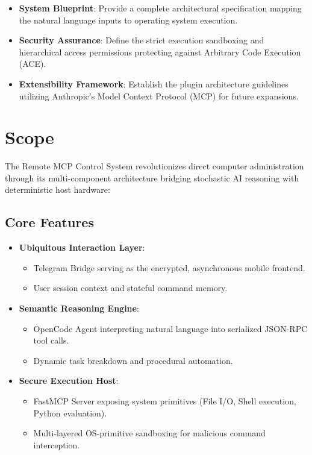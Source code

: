\documentclass{scrreprt}
\begin{document}
\begin{itemize}
    \item \textbf{System Blueprint}: Provide a complete architectural specification mapping the natural language inputs to operating system execution.
    \item \textbf{Security Assurance}: Define the strict execution sandboxing and hierarchical access permissions protecting against Arbitrary Code Execution (ACE).
    \item \textbf{Extensibility Framework}: Establish the plugin architecture guidelines utilizing Anthropic's Model Context Protocol (MCP) for future expansions.
\end{itemize}

\section{Scope}
\label{sec:scope}
The Remote MCP Control System revolutionizes direct computer administration through its multi-component architecture bridging stochastic AI reasoning with deterministic host hardware:

\subsection*{Core Features}
\begin{itemize}
    \item \textbf{Ubiquitous Interaction Layer}:
    \begin{itemize}
        \item Telegram Bridge serving as the encrypted, asynchronous mobile frontend.
        \item User session context and stateful command memory.
    \end{itemize}
    
    \item \textbf{Semantic Reasoning Engine}:
    \begin{itemize}
        \item OpenCode Agent interpreting natural language into serialized JSON-RPC tool calls.
        \item Dynamic task breakdown and procedural automation.
    \end{itemize}

    \item \textbf{Secure Execution Host}:
    \begin{itemize}
        \item FastMCP Server exposing system primitives (File I/O, Shell execution, Python evaluation).
        \item Multi-layered OS-primitive sandboxing for malicious command interception.
    \end{itemize}
\end{itemize}
\end{document}
